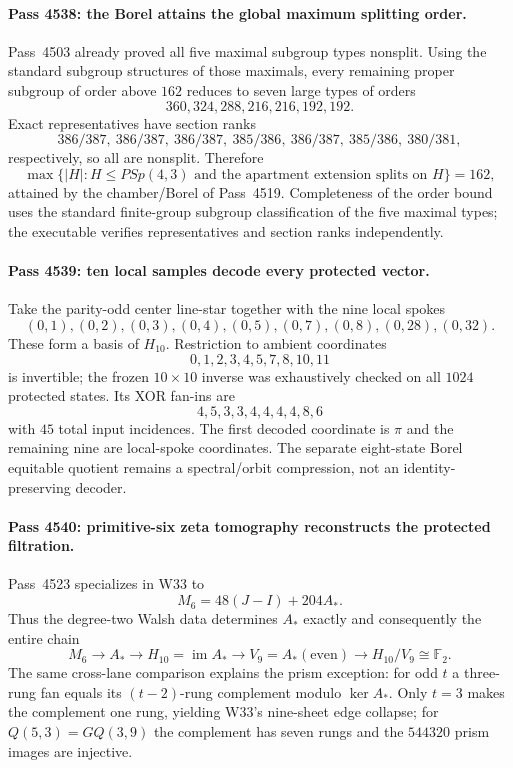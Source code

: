 \paragraph{Pass 4538: the Borel attains the global maximum splitting order.}
Pass~4503 already proved all five maximal subgroup types nonsplit.  Using the
standard subgroup structures of those maximals, every remaining proper subgroup
of order above $162$ reduces to seven large types of orders
\[
 360,324,288,216,216,192,192.
\]
Exact representatives have section ranks
\[
 386/387,\ 386/387,\ 386/387,\ 385/386,\ 386/387,\ 385/386,\ 380/381,
\]
respectively, so all are nonsplit.  Therefore
\[
 \boxed{\max\{|H|:H\le PSp(4,3)\text{ and the apartment extension splits on }H\}=162,}
\]
attained by the chamber/Borel of Pass~4519.  Completeness of the order bound uses
the standard finite-group subgroup classification of the five maximal types;
the executable verifies representatives and section ranks independently.

\paragraph{Pass 4539: ten local samples decode every protected vector.}
Take the parity-odd center line-star together with the nine local spokes
\[
 (0,1),(0,2),(0,3),(0,4),(0,5),(0,7),(0,8),(0,28),(0,32).
\]
These form a basis of $H_{10}$.  Restriction to ambient coordinates
\[
 0,1,2,3,4,5,7,8,10,11
\]
is invertible; the frozen $10\times10$ inverse was exhaustively checked on all
$1024$ protected states.  Its XOR fan-ins are
\[
 4,5,3,3,4,4,4,4,8,6
\]
with $45$ total input incidences.  The first decoded coordinate is $\pi$ and the
remaining nine are local-spoke coordinates.  The separate eight-state Borel
equitable quotient remains a spectral/orbit compression, not an identity-
preserving decoder.

\paragraph{Pass 4540: primitive-six zeta tomography reconstructs the protected filtration.}
Pass~4523 specializes in W33 to
\[
 M_6=48(J-I)+204A_*.
\]
Thus the degree-two Walsh data determines $A_*$ exactly and consequently the
entire chain
\[
 M_6\longrightarrow A_*\longrightarrow H_{10}=\operatorname{im}A_*
 \longrightarrow V_9=A_*(\text{even})\longrightarrow H_{10}/V_9\cong\mathbb F_2.
\]
The same cross-lane comparison explains the prism exception: for odd $t$ a
three-rung fan equals its $(t-2)$-rung complement modulo $\ker A_*$.  Only
$t=3$ makes the complement one rung, yielding W33's nine-sheet edge collapse;
for $Q(5,3)=GQ(3,9)$ the complement has seven rungs and the $544320$ prism
images are injective.

